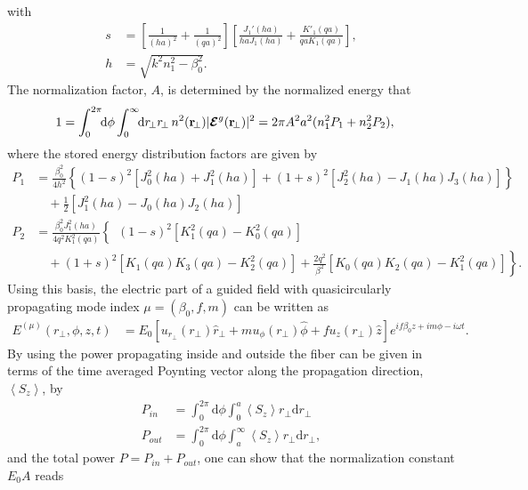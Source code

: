 \documentclass[preprint,aps,pra,onecolumn]{revtex4-1} %
\begin{document}
with
\begin{align}
s &= \left[\frac{1}{(ha)^2}+ \frac{1}{(qa)^2} \right] \left[ \frac{J_1'(ha)}{haJ_1(ha)} + \frac{K'_1(qa)}{qaK_1(qa)} \right],\\
h &= \sqrt{k^2 n_1^2-\beta_0^2}.
\end{align}
The normalization factor, $A$, is determined by the normalized energy that 
\begin{align}
1 &= \int_0^{2\pi} \!\!\mathrm{d} \phi \int_0^\infty\!\!\mathrm{d}r\!_\perp r\!_\perp\,  n^2(\br\!_\perp)|\boldsymbol{\mathcal{E}}^g(\br\!_\perp)|^2 = 2\pi A^2 a^2 (n_1^2P_1 + n_2^2P_2),
\end{align}
where the stored energy distribution factors are given by
\begin{align}
\!\!\!\!\! P_1
&= \frac{\beta_0^2}{4h^2}\!\left\{(1\!-\! s)^2\!\left[J_0^2(ha)\!+\! J_1^2(ha) \right] \!+\!(1\!+\!s)^2\!\left[J_2^2(ha)\!-\!J_1(ha)J_3(ha) \right]\right\}\nonumber\\
&\quad +\frac{1}{2}\left[J_1^2(ha)-J_0(ha)J_2(ha) \right] \\
\!\!\!\!\! P_2
&= \frac{\beta_0^2J_1^2(ha)}{4q^2K_1^2(qa)}\!\left\{\phantom{\frac{1}{1}}\!\!\!\!(1\!-\!s)^2\!\left[K_1^2(qa)\!-\!K_0^2(qa) \right]\right.\nonumber\\
&\quad\left. \!+(1\!+\!s)^2\!\!\left[K\!_1\!(qa)K\!_3\!(qa)\!-\! K_2^2\!(qa) \right]\!+\!\frac{2q^2}{\beta^2}\!\!\left[K\!_0\!(qa)K\!_2\!(qa)\!-\!K_1^2\!(qa) \right]  \right\}.
\end{align}
Using this basis, the electric part of a guided field with quasicircularly propagating mode index $\mu=(\beta_0, f, m)$ can be written as 
\begin{align}
E^{(\mu)}(r\!_\perp,\phi,z,t) &=E_0\left[u_{r\!_\perp}\!(r\!_\perp) \hat{r}\!_\perp \!+\! m u_{\phi}(r\!_\perp) \hat{\phi} \!+\! f u_z (r\!_\perp) \hat{z}\right]e^{if\beta_0 z+im\phi-i\omega t }.
\end{align}
By using the power propagating inside and outside the fiber can be given in terms of the time averaged Poynting vector along the propagation direction, $\left< S_z \right>$, by
\begin{align}
P_{in} &= \int_0^{2\pi} \mathrm{d}\phi \int_0^a \left< S_z \right> r\!_\perp \mathrm{d}r\!_\perp\\
P_{out} &= \int_0^{2\pi} \mathrm{d}\phi \int_a^\infty \left< S_z \right> r\!_\perp \mathrm{d}r\!_\perp,
\end{align}
and the total power $ P=P_{in}+P_{out} $, one can show that the normalization constant $ E_0 A $ reads
\end{document}
